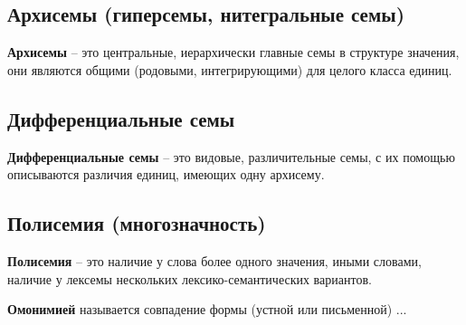\documentclass{article}
\begin{document}
\subsection{Архисемы (гиперсемы, нитегральные семы)}
\textbf{Архисемы} -- это центральные, иерархически главные семы в структуре значения,
они являются общими (родовыми, интегрирующими) для целого класса единиц.

\subsection{Дифференциальные семы}
\textbf{Дифференциальные семы} -- это видовые, различительные семы, с их помощью описываются различия
единиц, имеющих одну архисему.

\subsection{Полисемия (многозначность)}
\textbf{Полисемия} -- это наличие у слова более одного значения, иными словами, наличие у лексемы
нескольких лексико-семантических вариантов.

\textbf{Омонимией} называется совпадение формы (устной или письменной) ...
\end{document}
